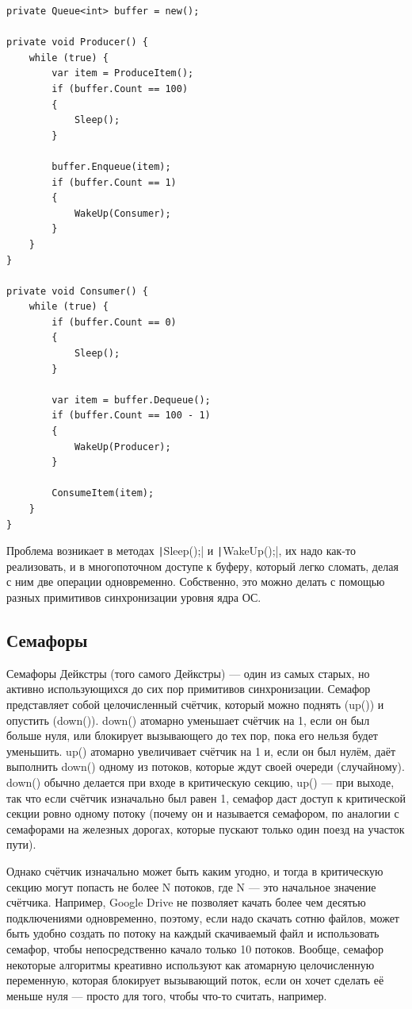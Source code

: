 \documentclass[a5paper]{article}
\begin{document}
\begin{verbatim}
private Queue<int> buffer = new();

private void Producer() {
    while (true) {
        var item = ProduceItem();
        if (buffer.Count == 100)
        {
            Sleep();
        }

        buffer.Enqueue(item);
        if (buffer.Count == 1)
        {
            WakeUp(Consumer);
        }
    }
}

private void Consumer() {
    while (true) {
        if (buffer.Count == 0)
        {
            Sleep();
        }

        var item = buffer.Dequeue();
        if (buffer.Count == 100 - 1)
        {
            WakeUp(Producer);
        }

        ConsumeItem(item);
    }
}
\end{verbatim}

Проблема возникает в методах \texttt|Sleep();| и \texttt|WakeUp();|, их надо как-то реализовать, и в многопоточном доступе к буферу, который легко сломать, делая с ним две операции одновременно. Собственно, это можно делать с помощью разных примитивов синхронизации уровня ядра ОС.

\subsection{Семафоры}

Семафоры Дейкстры (того самого Дейкстры) --- один из самых старых, но активно использующихся до сих пор примитивов синхронизации. Семафор представляет собой целочисленный счётчик, который можно поднять (up()) и опустить (down()). down() атомарно уменьшает счётчик на 1, если он был больше нуля, или блокирует вызывающего до тех пор, пока его нельзя будет уменьшить. up() атомарно увеличивает счётчик на 1 и, если он был нулём, даёт выполнить down() одному из потоков, которые ждут своей очереди (случайному). down() обычно делается при входе в критическую секцию, up() --- при выходе, так что если счётчик изначально был равен 1, семафор даст доступ к критической секции ровно одному потоку (почему он и называется семафором, по аналогии с семафорами на железных дорогах, которые пускают только один поезд на участок пути). 

Однако счётчик изначально может быть каким угодно, и тогда в критическую секцию могут попасть не более N потоков, где N --- это начальное значение счётчика. Например, Google Drive не позволяет качать более чем десятью подключениями одновременно, поэтому, если надо скачать сотню файлов, может быть удобно создать по потоку на каждый скачиваемый файл и использовать семафор, чтобы непосредственно качало только 10 потоков. Вообще, семафор некоторые алгоритмы креативно используют как атомарную целочисленную переменную, которая блокирует вызывающий поток, если он хочет сделать её меньше нуля --- просто для того, чтобы что-то считать, например.
\end{document}
